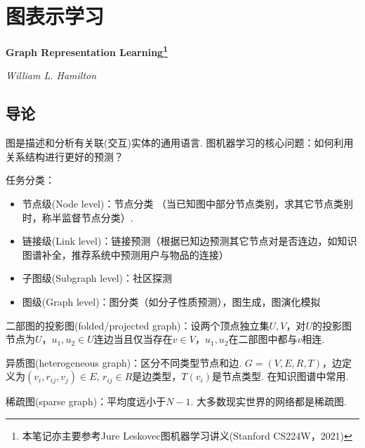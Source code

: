 
\chapter{图表示学习}
\Large\textbf{Graph Representation Learning\footnote{本笔记亦主要参考Jure Leskovec图机器学习讲义(Stanford CS224W，2021)}}
\par \emph{William L. Hamilton} \normalsize

\section{导论}

\par 图是描述和分析有关联(交互)实体的通用语言. 图机器学习的核心问题：如何利用关系结构进行更好的预测？

\par 任务分类：
\begin{itemize}
    \item 节点级(Node level)：节点分类 （当已知图中部分节点类别，求其它节点类别时，称半监督节点分类）. 
    \item 链接级(Link level)：链接预测（根据已知边预测其它节点对是否连边，如知识图谱补全，推荐系统中预测用户与物品的连接）
    \item 子图级(Subgraph level)：社区探测
    \item 图级(Graph level)：图分类（如分子性质预测），图生成，图演化模拟
\end{itemize}

\par 二部图的投影图(folded/projected graph)：设两个顶点独立集$U,V$，对$U$的投影图节点为$U$，$u_1,u_2\in U$连边当且仅当存在$v\in V$，$u_1,u_2$在二部图中都与$v$相连. 

\par 异质图(heterogeneous graph)：区分不同类型节点和边.  $G=(V,E,R,T)$，边定义为$(v_i,r_{ij},v_j)\in E$, $r_{ij}\in R$是边类型，$T(v_i)$是节点类型. 在知识图谱中常用. 

\par 稀疏图(sparse graph)：平均度远小于$N-1$. 大多数现实世界的网络都是稀疏图.

